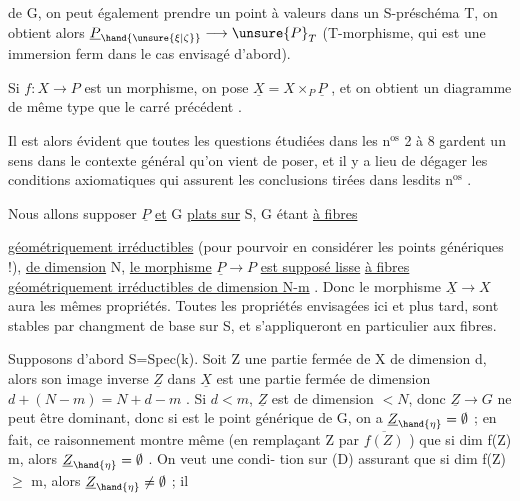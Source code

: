 de G, on peut également prendre un point à valeurs dans un S-préschéma T,
on obtient alors $\underline{P}_{\hand{\unsure{\xi|\zeta}}} \longrightarrow \unsure{P}_T$ (T-morphisme, qui est une immersion ferm
dans le cas envisagé d'abord).

Si $f:X \longrightarrow P$ est un morphisme, on pose $\underline{X} = X\times_P\underline{P}$ , et on obtient
un diagramme de même type que le carré précédent
.

Il est alors évident que toutes les questions étudiées dans les n$^{\text{os}}$ 2 à 8
gardent un sens dans le contexte général qu'on vient de poser, et il y a
lieu de dégager les conditions axiomatiques qui assurent les conclusions
tirées dans lesdits n$^{\text{os}}$ .

Nous allons supposer $\underline{P}$ \uline{et} G \uline{plats sur} S, G étant \uline{à fibres}

\uline{géométriquement irréductibles} (pour pourvoir en considérer les points
génériques !), \uline{de dimension} N, \uline{le morphisme} $\underline{P} \longrightarrow P$ \uline{est supposé lisse}
\uline{à fibres géométriquement irréductibles de dimension N-m} . Donc le
morphisme $\underline{X} \longrightarrow X$ aura les mêmes propriétés. Toutes les propriétés
envisagées ici et plus tard, sont stables par changment de base sur S, et s'appliqueront
en particulier aux fibres.

Supposons d'abord S=Spec(k). Soit Z une partie fermée de X de
dimension d, alors son image inverse $\underline{Z}$ dans $\underline{X}$ est une partie fermée de
dimension $d + (N-m) = N + d-m$ . Si $d < m$, $\underline{Z}$ est de dimension $< N$,
donc $\underline{Z} \longrightarrow G$ ne peut être dominant, donc si \hand{$\eta$} est le point générique de
G, on a $\underline{Z}_{\hand{\eta}} = \emptyset$ ; en fait, ce raisonnement montre même (en remplaçant
Z par $\overline{f(Z)}$ ) que si dim f(Z) \hand{$<$} m, alors $\underline{Z}_{\hand{\eta}} = \emptyset$ . On veut une condi-%
tion sur (D) assurant que si dim f(Z) $\geq$ m, alors $\underline{Z}_{\hand{\eta}} \neq \emptyset$ ;  il

